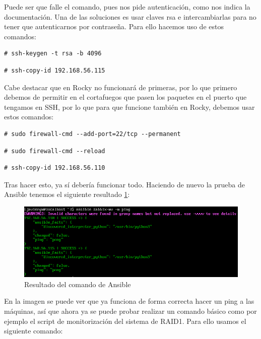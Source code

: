 Puede ser que falle el comando, pues nos pide autenticación, como nos indica la documentación. Una de las soluciones es usar claves rsa e intercambiarlas para no tener que autenticarnos por contraseña. Para ello hacemos uso de estos comandos: 

\begin{lstlisting}
# ssh-keygen -t rsa -b 4096
\end{lstlisting}

\begin{lstlisting}
# ssh-copy-id 192.168.56.115
\end{lstlisting}

Cabe destacar que en Rocky no funcionará de primeras, por lo que primero debemos de permitir en el cortafuegos que pasen los paquetes en el puerto que tengamos en SSH, por lo que para que funcione también en Rocky, debemos usar estos comandos:

\begin{lstlisting}
# sudo firewall-cmd --add-port=22/tcp --permanent
\end{lstlisting}

\begin{lstlisting}
# sudo firewall-cmd --reload
\end{lstlisting}

\begin{lstlisting}
# ssh-copy-id 192.168.56.110
\end{lstlisting}

Tras hacer esto, ya sí debería funcionar todo. Haciendo de nuevo la prueba de Ansible tenemos el siguiente resultado \ref{fig:ansible-prueba-2}:

\begin{figure}[H]
  \centering
  \includegraphics[scale=0.8]{Captura22}
  \caption{Resultado del comando de Ansible}
  \label{fig:ansible-prueba-2}
\end{figure}

En la imagen se puede ver que ya funciona de forma correcta hacer un ping a las máquinas, así que ahora ya se puede probar realizar un comando básico como por ejemplo el script de monitorización del sistema de RAID1. Para ello usamos el siguiente comando: 

